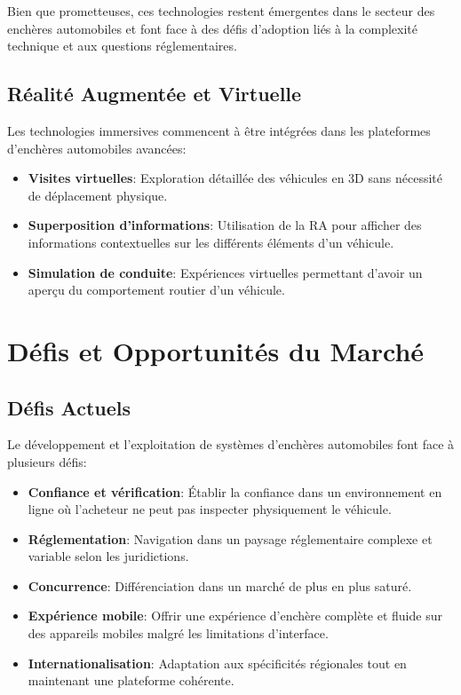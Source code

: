Bien que prometteuses, ces technologies restent émergentes dans le secteur des enchères automobiles et font face à des défis d'adoption liés à la complexité technique et aux questions réglementaires.

\subsection{Réalité Augmentée et Virtuelle}

Les technologies immersives commencent à être intégrées dans les plateformes d'enchères automobiles avancées:

\begin{itemize}
    \item \textbf{Visites virtuelles}: Exploration détaillée des véhicules en 3D sans nécessité de déplacement physique.
    
    \item \textbf{Superposition d'informations}: Utilisation de la RA pour afficher des informations contextuelles sur les différents éléments d'un véhicule.
    
    \item \textbf{Simulation de conduite}: Expériences virtuelles permettant d'avoir un aperçu du comportement routier d'un véhicule.
\end{itemize}

\section{Défis et Opportunités du Marché}

\subsection{Défis Actuels}

Le développement et l'exploitation de systèmes d'enchères automobiles font face à plusieurs défis:

\begin{itemize}
    \item \textbf{Confiance et vérification}: Établir la confiance dans un environnement en ligne où l'acheteur ne peut pas inspecter physiquement le véhicule.
    
    \item \textbf{Réglementation}: Navigation dans un paysage réglementaire complexe et variable selon les juridictions.
    
    \item \textbf{Concurrence}: Différenciation dans un marché de plus en plus saturé.
    
    \item \textbf{Expérience mobile}: Offrir une expérience d'enchère complète et fluide sur des appareils mobiles malgré les limitations d'interface.
    
    \item \textbf{Internationalisation}: Adaptation aux spécificités régionales tout en maintenant une plateforme cohérente.
\end{itemize}

